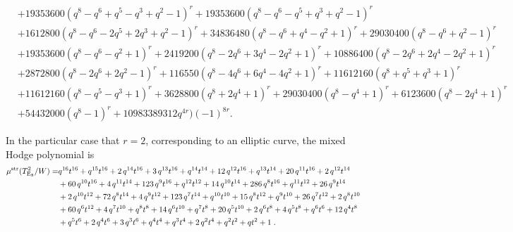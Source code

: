 \documentclass[11pt,english]{amsart}
\numberwithin{equation}{section}
\numberwithin{figure}{section}
\theoremstyle{plain}
\theoremstyle{plain}
\theoremstyle{definition}
\theoremstyle{remark}
\newcommand{\E}{\operatorname{E}}
\newcommand{\str}{\textup{str}}
\begin{document}
{\begin{align*}
& + 19353600  {\left(q^{8} - q^{6} + q^{5} - q^{3} + q^{2} - 1\right)}^{r} + 19353600  {\left(q^{8} - q^{6} - q^{5} + q^{3} + q^{2} - 1\right)}^{r} \\
& + 1612800  {\left(q^{8} - q^{6} - 2  q^{5} + 2  q^{3} + q^{2} - 1\right)}^{r} + 34836480  {\left(q^{8} - q^{6} + q^{4} - q^{2} + 1\right)}^{r} + 29030400  {\left(q^{8} - q^{6} + q^{2} - 1\right)}^{r} \\
& + 19353600  {\left(q^{8} - q^{6} - q^{2} + 1\right)}^{r} + 2419200  {\left(q^{8} - 2  q^{6} + 3  q^{4} - 2  q^{2} + 1\right)}^{r} + 10886400  {\left(q^{8} - 2  q^{6} + 2  q^{4} - 2  q^{2} + 1\right)}^{r} \\
& + 2872800  {\left(q^{8} - 2  q^{6} + 2  q^{2} - 1\right)}^{r} + 116550  {\left(q^{8} - 4  q^{6} + 6  q^{4} - 4  q^{2} + 1\right)}^{r} + 11612160  {\left(q^{8} + q^{5} + q^{3} + 1\right)}^{r} \\
& + 11612160  {\left(q^{8} - q^{5} - q^{3} + 1\right)}^{r} + 3628800  {\left(q^{8} + 2  q^{4} + 1\right)}^{r} + 29030400  {\left(q^{8} - q^{4} + 1\right)}^{r} + 6123600  {\left(q^{8} - 2  q^{4} + 1\right)}^{r} \\
& + 54432000  {\left(q^{8} - 1\right)}^{r} + 10983389312  q^{4  r}\Biggr) \left(-1\right)^{8  r}.
\end{align*}}

In the particular case that $r = 2$, corresponding to an elliptic curve, the mixed Hodge polynomial is
\begin{align*}
\mu^{\str}(T_{\E_8}^2/W) =& q^{16} t^{16} + q^{15} t^{16} + 2 \, q^{14} t^{16} + 3 \, q^{13} t^{16} + q^{14} t^{14} + 12 \, q^{12} t^{16} + q^{13} t^{14} + 20 \, q^{11} t^{16} + 2 \, q^{12} t^{14} \\
& + 60 \, q^{10} t^{16} + 4 \, q^{11} t^{14} + 123 \, q^{9} t^{16} + q^{12} t^{12} + 14 \, q^{10} t^{14} + 286 \, q^{8} t^{16} + q^{11} t^{12} + 26 \, q^{9} t^{14} \\
& + 2 \, q^{10} t^{12} + 72 \, q^{8} t^{14} + 4 \, q^{9} t^{12} + 123 \, q^{7} t^{14} + q^{10} t^{10} + 15 \, q^{8} t^{12} + q^{9} t^{10} + 26 \, q^{7} t^{12} + 2 \, q^{8} t^{10} \\
& + 60 \, q^{6} t^{12} + 4 \, q^{7} t^{10} + q^{8} t^{8} + 14 \, q^{6} t^{10} + q^{7} t^{8} + 20 \, q^{5} t^{10} + 2 \, q^{6} t^{8} + 4 \, q^{5} t^{8} + q^{6} t^{6} + 12 \, q^{4} t^{8} \\
& + q^{5} t^{6} + 2 \, q^{4} t^{6} + 3 \, q^{3} t^{6} + q^{4} t^{4} + q^{3} t^{4} + 2 \, q^{2} t^{4} + q^{2} t^{2} + q t^{2} + 1\; .
\end{align*}
\end{document}

